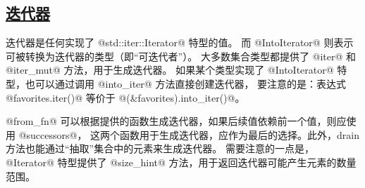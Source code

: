 \subsection{\href{https://doc.rust-lang.org/std/iter/trait.Iterator.html}{迭代器}}
迭代器是任何实现了 @std::iter::Iterator@ 特型的值。
而 @IntoIterator@ 则表示可被转换为迭代器的类型（即“可迭代者”）。
大多数集合类型都提供了 @iter@ 和 @iter_mut@ 方法，用于生成迭代器。
如果某个类型实现了 @IntoIterator@ 特型，也可以通过调用 @into_iter@ 方法直接创建迭代器，
要注意的是：表达式 @favorites.iter()@ 等价于 @(&favorites).into_iter()@。

@from_fn@ 可以根据提供的函数生成迭代器，如果后续值依赖前一个值，则应使用 @successors@，
这两个函数用于生成迭代器，应作为最后的选择。此外，drain 方法也能通过“抽取”集合中的元素来生成迭代器。
需要注意的一点是，@Iterator@ 特型提供了 @size_hint@ 方法，用于返回迭代器可能产生元素的数量范围。

